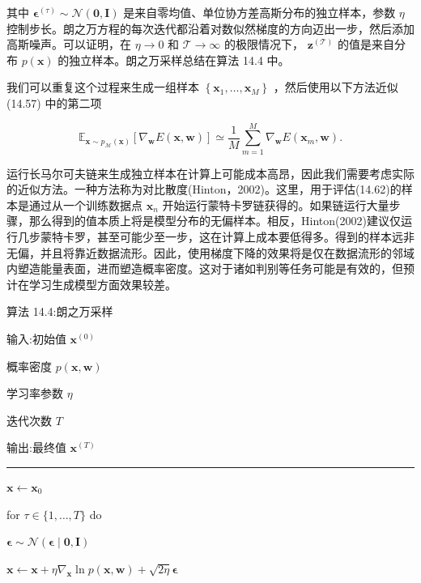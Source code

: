 \documentclass[10pt]{article}
\newcommand{\HRule}{\begin{center}\rule{0.9\linewidth}{0.2mm}\end{center}}
\begin{document}
其中 \({\mathbf{\epsilon }}^{\left( \tau \right) } \sim  \mathcal{N}\left( {\mathbf{0},\mathbf{I}}\right)\) 是来自零均值、单位协方差高斯分布的独立样本，参数 \(\eta\) 控制步长。朗之万方程的每次迭代都沿着对数似然梯度的方向迈出一步，然后添加高斯噪声。可以证明，在 \(\eta  \rightarrow  0\) 和 \(\mathcal{T} \rightarrow  \infty\) 的极限情况下， \({\mathbf{z}}^{\left( \mathcal{T}\right) }\) 的值是来自分布 \(p\left( \mathbf{x}\right)\) 的独立样本。朗之万采样总结在算法 14.4 中。

我们可以重复这个过程来生成一组样本 \(\left\{  {{\mathbf{x}}_{1},\ldots ,{\mathbf{x}}_{M}}\right\}\) ，然后使用以下方法近似 (14.57) 中的第二项

\[
{\mathbb{E}}_{\mathbf{x} \sim  {p}_{\mathcal{M}}\left( \mathbf{x}\right) }\left\lbrack  {{\nabla }_{\mathbf{w}}E\left( {\mathbf{x},\mathbf{w}}\right) }\right\rbrack   \simeq  \frac{1}{M}\mathop{\sum }\limits_{{m = 1}}^{M}{\nabla }_{\mathbf{w}}E\left( {{\mathbf{x}}_{m},\mathbf{w}}\right) . \tag{14.62}
\]

运行长马尔可夫链来生成独立样本在计算上可能成本高昂，因此我们需要考虑实际的近似方法。一种方法称为对比散度(Hinton，2002)。这里，用于评估(14.62)的样本是通过从一个训练数据点 \({\mathbf{x}}_{n}\) 开始运行蒙特卡罗链获得的。如果链运行大量步骤，那么得到的值本质上将是模型分布的无偏样本。相反，Hinton(2002)建议仅运行几步蒙特卡罗，甚至可能少至一步，这在计算上成本要低得多。得到的样本远非无偏，并且将靠近数据流形。因此，使用梯度下降的效果将是仅在数据流形的邻域内塑造能量表面，进而塑造概率密度。这对于诸如判别等任务可能是有效的，但预计在学习生成模型方面效果较差。

算法 14.4:朗之万采样

输入:初始值 \({\mathbf{x}}^{\left( 0\right) }\)

概率密度 \(p\left( {\mathbf{x},\mathbf{w}}\right)\)

学习率参数 \(\eta\)

迭代次数 \(T\)

输出:最终值 \({\mathbf{x}}^{\left( T\right) }\)

\HRule

\(\mathbf{x} \leftarrow  {\mathbf{x}}_{0}\)

for \(\tau  \in  \{ 1,\ldots ,T\}\) do

\hspace*{1em} \(\mathbf{\epsilon } \sim  \mathcal{N}\left( {\mathbf{\epsilon } \mid  \mathbf{0},\mathbf{I}}\right)\)

\hspace*{1em} \(\mathbf{x} \leftarrow  \mathbf{x} + \eta {\nabla }_{\mathbf{x}}\ln p\left( {\mathbf{x},\mathbf{w}}\right)  + \sqrt{2\eta }\mathbf{\epsilon }\)
\end{document}
